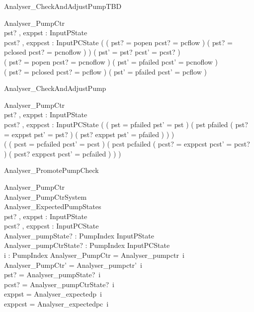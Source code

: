\documentclass{article}
\begin{document}
\begin{schema}{Analyser\_CheckAndAdjustPumpTBD}

 \Delta Analyser\_PumpCtr \\
 pst? , exppst : InputPState \\
 pcst? , exppcst : InputPCState 
\where
 ( ( pst? = popen \land pcst? = pcflow ) \lor ( pst? = pclosed \land pcst? = pcnoflow ) ) \implies ( pst' = pst? \land pcst' = pcst? ) \\
 ( pst? = popen \land pcst? = pcnoflow ) \implies ( pst' = pfailed \land pcst' = pcnoflow ) \\
 ( pst? = pclosed \land pcst? = pcflow ) \implies ( pst' = pfailed \land pcst' = pcflow )
\end{schema}

\begin{schema}{Analyser\_CheckAndAdjustPump}

 \Delta Analyser\_PumpCtr \\
 pst? , exppst : InputPState \\
 pcst? , exppcst : InputPCState 
\where
 ( ( pst = pfailed \land pst' = pst ) \lor ( pst \neq pfailed \land ( pst? = exppst \implies pst' = pst? ) \land ( pst? \neq exppst \implies pst' = pfailed ) ) ) \\
 ( ( pcst = pcfailed \land pcst' = pcst ) \lor ( pcst \neq pcfailed \land ( pcst? = exppcst \implies pcst' = pcst? ) \land ( pcst? \neq exppcst \implies pcst' = pcfailed ) ) )
\end{schema}

\begin{schema}{Analyser\_PromotePumpCheck}

 \Delta Analyser\_PumpCtr \\
 \Delta Analyser\_PumpCtrSystem \\
 Analyser\_ExpectedPumpStates \\
 pst? , exppst : InputPState \\
 pcst? , exppcst : InputPCState \\
 Analyser\_pumpState? : PumpIndex \fun InputPState \\
 Analyser\_pumpCtrState? : PumpIndex \fun InputPCState \\
 i : PumpIndex 
\where
 \theta Analyser\_PumpCtr = Analyser\_pumpctr~i \\
 \theta Analyser\_PumpCtr' = Analyser\_pumpctr'~i \\
 pst? = Analyser\_pumpState?~i \\
 pcst? = Analyser\_pumpCtrState?~i \\
 exppst = Analyser\_expectedp~i \\
 exppcst = Analyser\_expectedpc~i
\end{schema}
\end{document}
